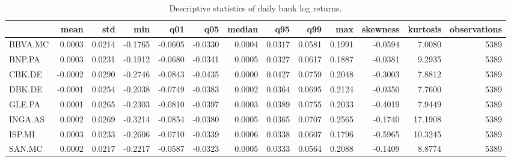 \begin{table}
\caption{Descriptive statistics of daily bank log returns.}
\label{tab:bank_return_descriptive_stats}
\begin{tabular}{lrrrrrrrrrrrr}
\toprule
 & mean & std & min & q01 & q05 & median & q95 & q99 & max & skewness & kurtosis & observations \\
\midrule
BBVA.MC & 0.0003 & 0.0214 & -0.1765 & -0.0605 & -0.0330 & 0.0004 & 0.0317 & 0.0581 & 0.1991 & -0.0594 & 7.0080 & 5389 \\
BNP.PA & 0.0003 & 0.0231 & -0.1912 & -0.0680 & -0.0341 & 0.0005 & 0.0327 & 0.0617 & 0.1887 & -0.0381 & 9.2935 & 5389 \\
CBK.DE & -0.0002 & 0.0290 & -0.2746 & -0.0843 & -0.0435 & 0.0000 & 0.0427 & 0.0759 & 0.2048 & -0.3003 & 7.8812 & 5389 \\
DBK.DE & -0.0001 & 0.0254 & -0.2038 & -0.0749 & -0.0383 & 0.0002 & 0.0364 & 0.0695 & 0.2124 & -0.0350 & 7.7600 & 5389 \\
GLE.PA & 0.0001 & 0.0265 & -0.2303 & -0.0810 & -0.0397 & 0.0003 & 0.0389 & 0.0755 & 0.2033 & -0.4019 & 7.9449 & 5389 \\
INGA.AS & 0.0002 & 0.0269 & -0.3214 & -0.0854 & -0.0380 & 0.0005 & 0.0365 & 0.0707 & 0.2565 & -0.1740 & 17.1908 & 5389 \\
ISP.MI & 0.0003 & 0.0233 & -0.2606 & -0.0710 & -0.0339 & 0.0006 & 0.0338 & 0.0607 & 0.1796 & -0.5965 & 10.3245 & 5389 \\
SAN.MC & 0.0002 & 0.0217 & -0.2217 & -0.0587 & -0.0323 & 0.0005 & 0.0333 & 0.0564 & 0.2088 & -0.1409 & 8.8774 & 5389 \\
\bottomrule
\end{tabular}
\end{table}
